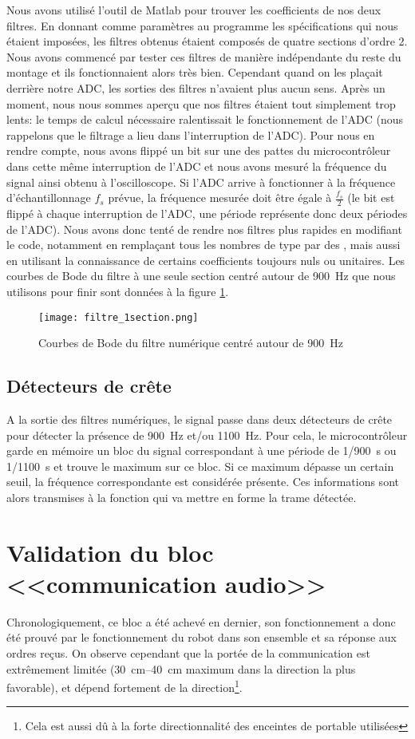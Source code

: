 Nous avons utilisé l'outil  de Matlab pour trouver les coefficients de nos deux filtres. En donnant comme paramètres au programme les spécifications qui nous étaient imposées, les filtres obtenus étaient composés de quatre sections d'ordre 2. Nous avons commencé par tester ces filtres de manière indépendante du reste du montage et ils fonctionnaient alors très bien. Cependant quand on les plaçait derrière notre ADC, les sorties des filtres n'avaient plus aucun sens. Après un moment, nous nous sommes aperçu que nos filtres étaient tout simplement trop lents: le temps de calcul nécessaire ralentissait le fonctionnement de l'ADC (nous rappelons que le filtrage a lieu dans l'interruption de l'ADC). Pour nous en rendre compte, nous avons flippé un bit sur une des pattes du microcontrôleur dans cette même interruption de l'ADC et nous avons mesuré la fréquence du signal ainsi obtenu à l'oscilloscope. Si l'ADC arrive à fonctionner à la fréquence d'échantillonnage $f_s$  prévue, la fréquence mesurée doit être égale à $\frac{f_s}{2}$ (le bit est flippé à chaque interruption de l'ADC, une période représente donc deux périodes de l'ADC). Nous avons donc tenté de rendre nos filtres plus rapides en modifiant le code, notamment en remplaçant tous les nombres de type  par des , mais aussi en utilisant la connaissance de certains coefficients toujours nuls ou unitaires. Les courbes de Bode du filtre à une seule section centré autour de \SI{900}{\hertz} que nous utilisons pour finir sont données à la figure \ref{fig:filtre_1section}.
\begin{figure}[htbp]
\centering
\texttt{[image: filtre\_1section.png]}
\caption{Courbes de Bode du filtre numérique centré autour de \SI{900}{\hertz}}
\label{fig:filtre_1section}
\end{figure}

\subsection{Détecteurs de crête}
A la sortie des filtres numériques, le signal passe dans deux détecteurs de crête pour détecter la présence de \SI{900}{\hertz} et/ou \SI{1100}{\hertz}. Pour cela, le microcontrôleur garde en mémoire un bloc du signal correspondant à une période de \SI{1/900}{\second} ou \SI{1/1100}{\second} et trouve le maximum sur ce bloc. Si ce maximum dépasse un certain seuil, la fréquence correspondante est considérée présente. Ces informations sont alors transmises à la fonction  qui va mettre en forme la trame détectée.

\section{Validation du bloc <<communication audio>>}
Chronologiquement, ce bloc a été achevé en dernier, son fonctionnement a donc été prouvé par le fonctionnement du robot dans son ensemble et sa réponse aux ordres reçus. On observe cependant que la portée de la communication est extrêmement limitée (\SIrange{30}{40}{\centi\meter} maximum dans la direction la plus favorable), et dépend fortement de la direction\footnote{Cela est aussi dû à la forte directionnalité des enceintes de portable utilisées}.
